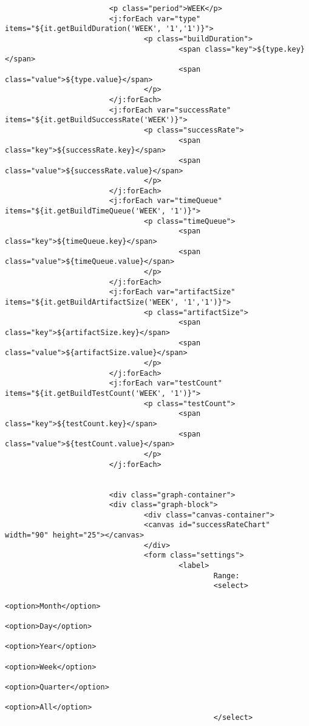 \begin{lstlisting}
                        <p class="period">WEEK</p>
                        <j:forEach var="type" items="${it.getBuildDuration('WEEK', '1','1')}">
                                <p class="buildDuration">
                                        <span class="key">${type.key}</span>
                                        <span class="value">${type.value}</span>
                                </p>
                        </j:forEach>
                        <j:forEach var="successRate" items="${it.getBuildSuccessRate('WEEK')}">
                                <p class="successRate">
                                        <span class="key">${successRate.key}</span>
                                        <span class="value">${successRate.value}</span>
                                </p>
                        </j:forEach>
                        <j:forEach var="timeQueue" items="${it.getBuildTimeQueue('WEEK', '1')}">
                                <p class="timeQueue">
                                        <span class="key">${timeQueue.key}</span>
                                        <span class="value">${timeQueue.value}</span>
                                </p>
                        </j:forEach>
                        <j:forEach var="artifactSize" items="${it.getBuildArtifactSize('WEEK', '1','1')}">
                                <p class="artifactSize">
                                        <span class="key">${artifactSize.key}</span>
                                        <span class="value">${artifactSize.value}</span>
                                </p>
                        </j:forEach>
                        <j:forEach var="testCount" items="${it.getBuildTestCount('WEEK', '1')}">
                                <p class="testCount">
                                        <span class="key">${testCount.key}</span>
                                        <span class="value">${testCount.value}</span>
                                </p>
                        </j:forEach>


                        <div class="graph-container">
                        <div class="graph-block">
                                <div class="canvas-container">
                                <canvas id="successRateChart" width="90" height="25"></canvas>
                                </div>
                                <form class="settings">
                                        <label>
                                                Range:
                                                <select>
                                                        <option>Month</option>
                                                        <option>Day</option>
                                                        <option>Year</option>
                                                        <option>Week</option>
                                                        <option>Quarter</option>
                                                        <option>All</option>
                                                </select>


\end{lstlisting}
